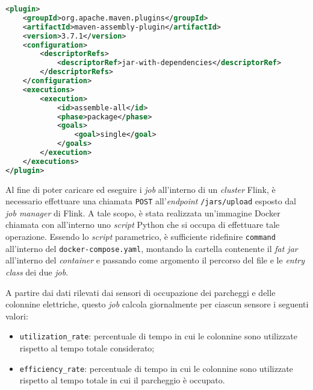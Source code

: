 \begin{lstlisting}[language=XML, caption=Configurazione del \textit{plugin} \texttt{maven-assembly-plugin} per la creazione del \textit{fat jar},captionpos=b]
<plugin>
    <groupId>org.apache.maven.plugins</groupId>
    <artifactId>maven-assembly-plugin</artifactId>
    <version>3.7.1</version>
    <configuration>
        <descriptorRefs>
            <descriptorRef>jar-with-dependencies</descriptorRef>
        </descriptorRefs>
    </configuration>
    <executions>
        <execution>
            <id>assemble-all</id>
            <phase>package</phase>
            <goals>
                <goal>single</goal>
            </goals>
        </execution>
    </executions>
</plugin>
\end{lstlisting}
Al fine di poter caricare ed eseguire i \textit{job} all'interno di un \textit{cluster} Flink, è necessario effettuare una chiamata \texttt{POST} all'\textit{endpoint} \texttt{/jars/upload}
esposto dal \textit{job manager} di Flink. A tale scopo, è stata realizzata un'immagine Docker chiamata \texttt{} con all'interno uno \textit{script}
Python che si occupa di effettuare tale operazione. Essendo lo \textit{script} parametrico, è sufficiente ridefinire \texttt{command} all'interno del \texttt{docker-compose.yaml},
montando la cartella contenente il \textit{fat jar} all'interno del \textit{container} e passando come argomento il percorso del file e le \textit{entry class} dei due \textit{job}.

A partire dai dati rilevati dai sensori di occupazione dei parcheggi e delle colonnine elettriche, questo \textit{job} calcola giornalmente per ciascun sensore i seguenti valori:
\begin{itemize}
	\item \texttt{utilization\_rate}: percentuale di tempo in cui le colonnine sono utilizzate rispetto al tempo totale considerato;
	\item \texttt{efficiency\_rate}: percentuale di tempo in cui le colonnine sono utilizzate rispetto al tempo totale in cui il parcheggio è occupato.
\end{itemize}


